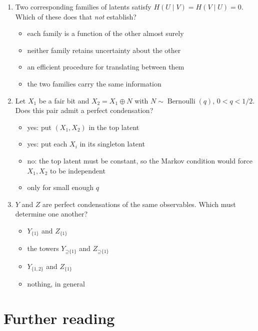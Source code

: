 \documentclass[11pt]{article}
\newcommand{\Up}{\mathord{\supseteq}}
\begin{document}
\begin{enumerate}
\item Two corresponding families of latents satisfy $H(U\mid V)=H(V\mid U)=0$.
Which of these does that \emph{not} establish?
\begin{itemize}
\item each family is a function of the other almost surely
\item neither family retains uncertainty about the other
\item an efficient procedure for translating between them
\item the two families carry the same information
\end{itemize}

\item Let $X_1$ be a fair bit and $X_2=X_1\mathbin{\oplus}N$ with
$N\sim\operatorname{Bernoulli}(q)$, $0<q<1/2$. Does this pair admit a perfect
condensation?
\begin{itemize}
\item yes: put $(X_1,X_2)$ in the top latent
\item yes: put each $X_i$ in its singleton latent
\item no: the top latent must be constant, so the Markov condition would force
$X_1,X_2$ to be independent
\item only for small enough $q$
\end{itemize}

\item $Y$ and $Z$ are perfect condensations of the same observables. Which must
determine one another?
\begin{itemize}
\item $Y_{\{1\}}$ and $Z_{\{1\}}$
\item the towers $Y_{\Up\{1\}}$ and $Z_{\Up\{1\}}$
\item $Y_{\{1,2\}}$ and $Z_{\{1\}}$
\item nothing, in general
\end{itemize}
\end{enumerate}

\section{Further reading}
\label{sec:further-reading}
\end{document}
